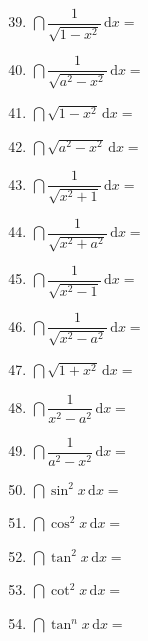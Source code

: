 \documentclass[a4paper,12pt]{article}
\begin{document}
    \begin{minipage}[t]{0.30\textwidth}
        \begin{enumerate}[leftmargin=*, itemsep=1.1em]
            \setcounter{enumi}{38}
            \item $\dint \dfrac{1}{\sqrt {1 - x^2}}\,\mathrm{d}x =$
            \item $\dint \dfrac{1}{\sqrt {a^2 - x^2}}\,\mathrm{d}x =$
            \item $\dint \sqrt {1 - x^2}\,\mathrm{d}x =$
            \item $\dint \sqrt {a^2 - x^2}\,\mathrm{d}x =$
            \item $\dint \dfrac{1}{\sqrt {x^2 + 1}}\,\mathrm{d}x =$
            \item $\dint \dfrac{1}{\sqrt {x^2 + a^2}}\,\mathrm{d}x =$
            \item $\dint \dfrac{1}{\sqrt {x^2 - 1}}\,\mathrm{d}x =$
            \item $\dint \dfrac{1}{\sqrt {x^2 - a^2}}\,\mathrm{d}x =$
            \item $\dint \sqrt{1+x^2}\,\mathrm{d}x =$
            \item $\dint \dfrac{1}{x^2 - a^2}\,\mathrm{d}x =$
            \item $\dint \dfrac{1}{a^2 - x^2}\,\mathrm{d}x =$
            \item $\dint \sin^2 x\,\mathrm{d}x =$
            \item $\dint \cos^2 x\,\mathrm{d}x =$
            \item $\dint \tan^2 x\,\mathrm{d}x =$
            \item $\dint \cot^2 x\,\mathrm{d}x =$
            \item $\dint \tan^n x\,\mathrm{d}x =$
        \end{enumerate}
    \end{minipage}
\end{document}
